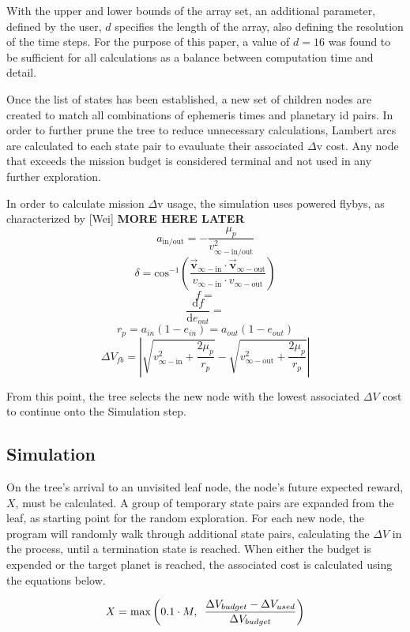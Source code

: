 \documentclass[letterpaper, preprint, paper,11pt]{AAS}	%
\begin{document}
With the upper and lower bounds of the array set, an additional parameter, defined by the user, $d$ specifies the length of the array, also defining the resolution of the time steps. For the purpose of this paper, a value of $d = 16$ was found to be sufficient for all calculations as a balance between computation time and detail. 

Once the list of states has been established, a new set of children nodes are created to match all combinations of ephemeris times and planetary id pairs. In order to further prune the tree to reduce unnecessary calculations, Lambert arcs are calculated to each state pair to evauluate their associated $\Delta \text{v}$ cost. Any node that exceeds the mission budget is considered terminal and not used in any further exploration.

In order to calculate mission $\Delta \text{v}$ usage, the simulation uses powered flybys, as characterized by [Wei] \textbf{MORE HERE LATER}
\[ a_\text{in/out} = -\frac{\mu_p}{v^2_{\infty-\text{in/out}}} \]
\[ \delta = \text{cos}^{-1}\left(\frac{ \vec{\textbf{v}}_{\infty-\text{in}} \cdot \vec{\textbf{v}}_{\infty-\text{out}} }{ v_{\infty-\text{in}} \cdot v_{\infty-\text{out}} }\right) \]
\[ f =  \]
\[ \frac{\text{d}f}{\text{d}e_{out}} =  \]
\[ r_p = a_{in}(1 - e_{in}) = a_{out}(1 - e_{out}) \]
\[ \Delta V_{fb} = \left| \sqrt{v^2_{\infty-\text{in}} + \frac{2\mu_p}{r_p}} - \sqrt{v^2_{\infty-\text{out}} + \frac{2\mu_p}{r_p}} \right| \]

From this point, the tree selects the new node with the lowest associated $\Delta V$ cost to continue onto the Simulation step.

\subsection{Simulation}

On the tree's arrival to an unvisited leaf node, the node's future expected reward, $X$, must be calculated. A group of temporary state pairs are expanded from the leaf, as starting point for the random exploration. For each new node, the program will randomly walk through additional state pairs, calculating the $\Delta V$ in the process, until a termination state is reached. When either the budget is expended or the target planet is reached, the associated cost is calculated using the equations below.

\begin{equation}
    \label{eq:simCost1}
    X = \text{max}\left( 0.1 \cdot M,\hspace{0.5em} \frac{\Delta V_{budget} - \Delta V_{used}}{\Delta V_{budget}} \right)
\end{equation}
\end{document}
